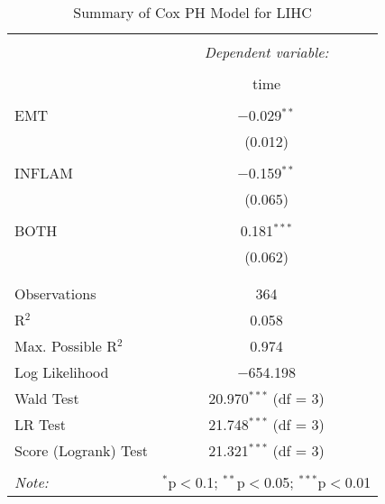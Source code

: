 
\begin{table}[!htbp] \centering 
  \caption{Summary of Cox PH Model for LIHC} 
  \label{table:LIHC_cph} 
\begin{tabular}{@{\extracolsep{5pt}}lc} 
\\[-1.8ex]\hline 
\hline \\[-1.8ex] 
 & \multicolumn{1}{c}{\textit{Dependent variable:}} \\ 
\cline{2-2} 
\\[-1.8ex] & time \\ 
\hline \\[-1.8ex] 
 EMT & $-$0.029$^{**}$ \\ 
  & (0.012) \\ 
  & \\ 
 INFLAM & $-$0.159$^{**}$ \\ 
  & (0.065) \\ 
  & \\ 
 BOTH & 0.181$^{***}$ \\ 
  & (0.062) \\ 
  & \\ 
\hline \\[-1.8ex] 
Observations & 364 \\ 
R$^{2}$ & 0.058 \\ 
Max. Possible R$^{2}$ & 0.974 \\ 
Log Likelihood & $-$654.198 \\ 
Wald Test & 20.970$^{***}$ (df = 3) \\ 
LR Test & 21.748$^{***}$ (df = 3) \\ 
Score (Logrank) Test & 21.321$^{***}$ (df = 3) \\ 
\hline 
\hline \\[-1.8ex] 
\textit{Note:}  & \multicolumn{1}{r}{$^{*}$p$<$0.1; $^{**}$p$<$0.05; $^{***}$p$<$0.01} \\ 
\end{tabular} 
\end{table} 
